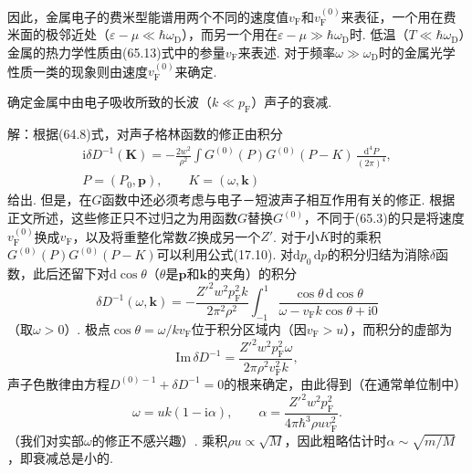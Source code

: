 因此，金属电子的费米型能谱用两个不同的速度值$v_{\mathrm F}$和$v^{(0)}_{\mathrm F}$来表征，一个用在费米面的极邻近处（$\varepsilon-\mu\ll\hbar\omega_{\mathrm D}$），而另一个用在$\varepsilon-\mu\gg\hbar\omega_{\mathrm D}$时. 低温（$T\ll\hbar\omega_{\mathrm D}$）金属的热力学性质由(65.13)式中的参量$v_{\mathrm F}$来表述. 对于频率$\omega\gg\omega_{\mathrm D}$时的金属光学性质一类的现象则由速度$v^{(0)}_{\mathrm F}$来确定.

\begin{xiti}
确定金属中由电子吸收所致的长波（$k\ll p_{\mathrm F}$）声子的衰减.

解：根据(64.8)式，对声子格林函数的修正由积分
\begin{equation*}
\begin{gathered}
\mathrm{i}\delta D^{-1}(\bm{K})=-\frac{2w^2}{\rho^2}
\int G^{(0)}(P)G^{(0)}(P-K)\,\frac{\mathrm{d}^4P}{(2\pi)^4},\\
P=(P_0,\bm{p}),\qquad K=(\omega,\bm{k})
\end{gathered}
\end{equation*}
给出. 但是，在$G$函数中还必须考虑与电子－短波声子相互作用有关的修正. 根据正文所述，这些修正只不过归之为用函数$G$替换$G^{(0)}$，不同于(65.3)的只是将速度$v^{(0)}_{\mathrm F}$换成$v_{\mathrm F}$，以及将重整化常数$Z$换成另一个$Z'$. 对于小$K$时的乘积$G^{(0)}(P)G^{(0)}(P-K)$可以利用公式(17.10). 对$\mathrm{d}p_0\,\mathrm{d}p$的积分归结为消除$\delta$函数，此后还留下对$\mathrm{d}\cos\theta$（$\theta$是$\bm{p}$和$\bm{k}$的夹角）的积分
\begin{equation*}
\delta D^{-1}(\omega,\bm{k})=-\frac{Z'^2w^2p^2_{\mathrm F}k}{2\pi^2\rho^2}
\int_{-1}^{1}\frac{\cos\theta\,\mathrm{d}\cos\theta}
{\omega-v_{\mathrm F}k\cos\theta+\mathrm{i}0}
\end{equation*}
（取$\omega>0$）. 极点$\cos\theta=\omega/kv_{\mathrm F}$位于积分区域内（因$v_{\mathrm F}>u$），而积分的虚部为
\begin{equation*}
\mathrm{Im}\,\delta D^{-1}=\frac{Z'^2w^2p^2_{\mathrm F}\omega}{2\pi\rho^2v^2_{\mathrm F}k},
\end{equation*}
声子色散律由方程$D^{(0)-1}+\delta D^{-1}=0$的根来确定，由此得到（在通常单位制中）
\begin{equation*}
\omega=uk(1-\mathrm{i}\alpha),\qquad
\alpha=\frac{Z'^2w^2p^2_{\mathrm F}}{4\pi\hbar^3\rho uv^2_{\mathrm F}}.
\end{equation*}
（我们对实部$\omega$的修正不感兴趣）. 乘积$\rho u\propto\sqrt{M}$，因此粗略估计时$\alpha\sim\sqrt{m/M}$，即衰减总是小的.
\end{xiti}

